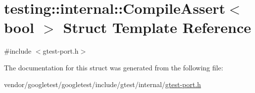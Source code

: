 \hypertarget{structtesting_1_1internal_1_1_compile_assert}{}\section{testing\+:\+:internal\+:\+:Compile\+Assert$<$ bool $>$ Struct Template Reference}
\label{structtesting_1_1internal_1_1_compile_assert}


{\ttfamily \#include $<$gtest-\/port.\+h$>$}



The documentation for this struct was generated from the following file\+:\begin{DoxyCompactItemize}
\item 
vendor/googletest/googletest/include/gtest/internal/\hyperlink{gtest-port_8h}{gtest-\/port.\+h}\end{DoxyCompactItemize}
